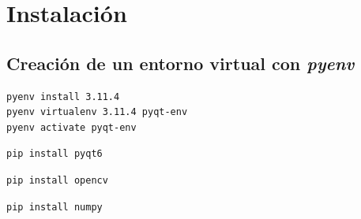 \pagestyle{fancy}
\fancyhead[l]{\autorUO}
\fancyfoot[l]{\asignaturaAbbr}
\fancyfoot[r]{\fecha}

\section{Instalación} \label{sec:instalacion}
\subsection{Creación de un entorno virtual con \textit{pyenv}} \label{subsec:pyenv}
\begin{lstlisting}[language=bash, caption={Creación de un entorno virtual con pyenv}, label={lst:pyenv}]
pyenv install 3.11.4
pyenv virtualenv 3.11.4 pyqt-env
pyenv activate pyqt-env
\end{lstlisting}
\begin{lstlisting}[language=bash, caption={Instalación de pyqt6}, label={lst:instalacion}]
pip install pyqt6
\end{lstlisting}
\begin{lstlisting}[language=bash, caption={Instalación de opencv}, label={lst:opencv}]
pip install opencv
\end{lstlisting}
\begin{lstlisting}[language=bash, caption={Instalación de numpy}, label={lst:numpy}]
pip install numpy
\end{lstlisting}